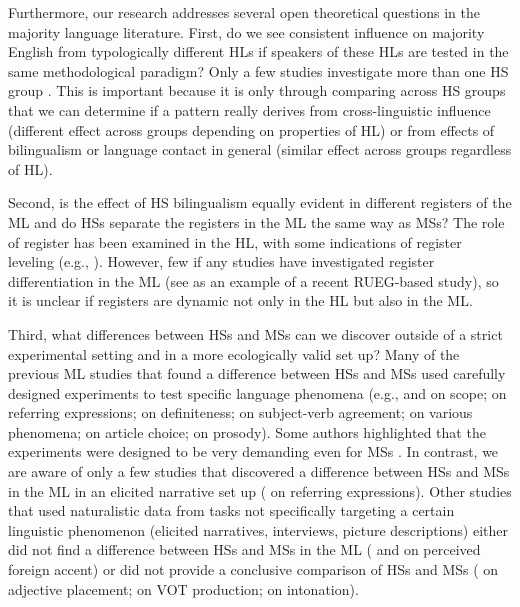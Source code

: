\documentclass[output=paper,colorlinks,citecolor=brown]{langscibook}
\begin{document}
Furthermore, our research addresses several open theoretical questions in the majority language literature. First, do we see consistent influence on majority English from typologically different HLs if speakers of these HLs  are tested in the same methodological  paradigm? Only a few studies investigate more than one HS group \parencite{Kupisch2014a, Polinsky2018book, Paradis2019, labrenz2023}. This is important because it is only through comparing across HS groups that we can determine if a pattern really derives from cross-linguistic influence (different effect across groups depending on properties of HL) or from effects of bilingualism or language contact in general (similar effect across groups regardless of HL). 

Second, is the effect of HS bilingualism equally evident in different registers of the ML and do HSs separate the registers in the ML the same way as MSs? The role of register has been examined in the HL, with some indications of register leveling (e.g., \cite{alexiadou2022, alexiadou2023, tsehaye2023}). However, few if any studies have investigated register differentiation in the ML (see \cite{labrenz2023} as an example of a recent RUEG-based study), so it is unclear if registers are dynamic not only in the HL but also in the ML. 

Third, what differences between HSs and MSs can we discover outside of a strict experimental setting and in a more ecologically valid set up? Many of the previous ML studies that found a difference between HSs and MSs used carefully designed experiments to test specific language phenomena (e.g., \cite{Lee2011} and \cite{Scontras2017} on scope; \cite{Contemori2021a} on referring expressions; \cite{Felser2019} on definiteness; \cite{Paradis2019} on subject-verb agreement; \cite{Bylund2012, Bylund2021} on various phenomena; \cite{MontrulIonin2010} on article choice; \cite{VanRijswijk2017} on prosody). Some authors highlighted that the experiments were designed to be very demanding even for MSs \parencite{Bylund2012, Paradis2019}. In contrast, we are aware of only a few studies that discovered a difference between HSs and MSs in the ML in an elicited narrative set up (\cite{azar2020reference, Contemori2023} on referring expressions). Other studies that used naturalistic data from tasks not specifically targeting a certain linguistic phenomenon (elicited narratives, interviews, picture descriptions) either did not find a difference between HSs and MSs in the ML (\cite{Kupisch2014a} and \cite{Lloyd-Smith2020} on perceived foreign accent) or did not provide a conclusive comparison of HSs and MSs (\cite{Kupisch2014} on adjective placement; \cite{lein2016} on VOT production; \cite{queen2012} on intonation). 
\end{document}
